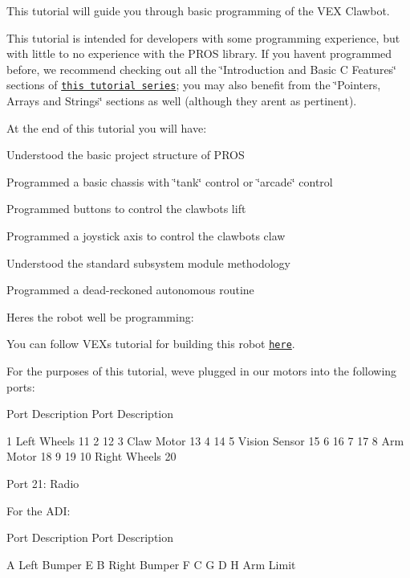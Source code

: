 This tutorial will guide you through basic programming of the V\+EX Clawbot.

This tutorial is intended for developers with some programming experience, but with little to no experience with the P\+R\+OS library. If you haven\textquotesingle{}t programmed before, we recommend checking out all the \char`\"{}\+Introduction and Basic C Features\char`\"{} sections of \href{http://www.studytonight.com/c/overview-of-c.php}{\tt this tutorial series}; you may also benefit from the \char`\"{}\+Pointers, Arrays and Strings\char`\"{} sections as well (although they aren\textquotesingle{}t as pertinent).

At the end of this tutorial you will have\+:


\begin{DoxyItemize}
\item Understood the basic project structure of P\+R\+OS
\item Programmed a basic chassis with \char`\"{}tank\char`\"{} control or \char`\"{}arcade\char`\"{} control
\item Programmed buttons to control the clawbot\textquotesingle{}s lift
\item Programmed a joystick axis to control the clawbot\textquotesingle{}s claw
\item Understood the standard subsystem module methodology
\item Programmed a dead-\/reckoned autonomous routine
\end{DoxyItemize}

Here\textquotesingle{}s the robot we\textquotesingle{}ll be programming\+:



You can follow V\+EX\textquotesingle{}s tutorial for building this robot \href{https://v5beta.vex.com/parent-wrapper.php?id=v5-with-clawbot}{\tt here}.

For the purposes of this tutorial, we\textquotesingle{}ve plugged in our motors into the following ports\+:

Port Description Port Description 

 1 Left Wheels 11 2 12 3 Claw Motor 13 4 14 5 Vision Sensor 15 6 16 7 17 8 Arm Motor 18 9 19 10 Right Wheels 20

Port 21\+: Radio

For the A\+DI\+:

Port Description Port Description 

 A Left Bumper E B Right Bumper F C G D H Arm Limit

